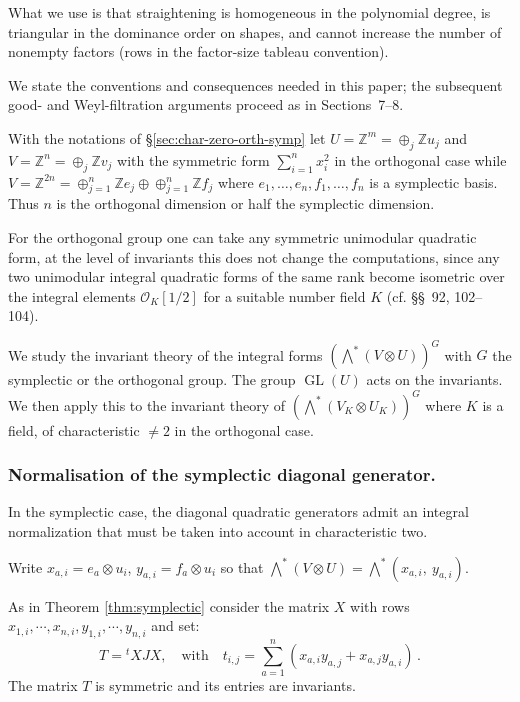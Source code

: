 \documentclass[10pt]{amsart}
\theoremstyle{definition}
\theoremstyle{remark}
\newcommand{\Z}{\mathbb Z}
\newcommand{\GL}{\operatorname{GL}}
\begin{document}
 What we use is that
straightening is homogeneous in the polynomial degree, is triangular
in the dominance order on shapes, and cannot increase the number of
nonempty factors (rows in the factor-size tableau convention). \smallskip

We state the conventions and consequences needed in this paper; the
subsequent good- and Weyl-filtration arguments proceed as in
Sections~7--8.  \smallskip



With the notations of \S \ref{sec:char-zero-orth-symp} let $U=\Z^m=\oplus_j\Z u_j$  and $V=\Z^n=\oplus_j\Z v_j$ with the symmetric form $\sum_{i=1}^nx_i^2$ in the orthogonal case while $V=\Z^{2n }=\oplus_{j=1}^n\Z e_j\oplus \oplus_{j=1}^n\Z f_j$ where    
$e_1,\dots,e_n,f_1,\dots,f_n$ is a symplectic basis. Thus $n$ is the orthogonal dimension or half the symplectic dimension.

For the orthogonal group one can take any symmetric unimodular quadratic form, at the level of invariants this does not change the computations, since any two unimodular integral quadratic forms of the same rank become isometric over the integral elements \(\mathcal O_K[1/2]\) for a suitable number field \(K\) (cf. \cite{O'Meara} \S\S~92, 102--104).\medskip



We study the invariant theory  of the integral forms $\left(\bigwedge^*(V \otimes U )\right)^{G}$ with $G$  the symplectic or the orthogonal group.  The group $\GL(U)$ acts on the invariants. We then apply this to  the invariant theory  of   $\left(\bigwedge^*(V_K \otimes U_K )\right)^{G}$ where $K$ is a field, of characteristic $\neq 2$ in the orthogonal case.\smallskip


\subsubsection{Normalisation of the symplectic diagonal generator.}
In the symplectic case, the diagonal quadratic generators admit an integral normalization that must be taken into account in characteristic two. 
\smallskip

Write
$x_{a,i}=e_a\otimes u_i$, $y_{a,i}=f_a\otimes u_i$ so that $\bigwedge^*(V \otimes U )=\bigwedge^*(x_{a,i},\ y_{a,i})$.

As in Theorem \ref{thm:symplectic} consider the matrix $X$ with rows $x_{1,i},\cdots, x_{n,i},y _{1,i},\cdots,  y_{n,i}$ and set:
  \[
T={}^tXJX,\quad\text{with}\quad  t_{i,j}=\sum_{a=1}^n(x_{a,i}y_{a,j}+x_{a,j}y_{a,i})\,.
\]
The matrix $T$ is symmetric and its entries are invariants.
\end{document}
